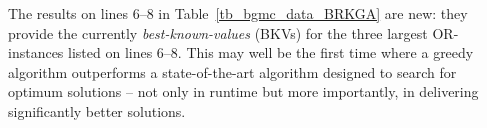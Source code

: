 \begin{description}
The results on lines 6--8 in Table~\ref{tb_bgmc_data_BRKGA} 
are new: they provide the currently {\it best-known-values} (BKVs) for the
three largest OR-instances listed on lines 6--8. 
This may well be the first time where a greedy algorithm outperforms
a state-of-the-art algorithm designed to search for optimum solutions -- 
not only in runtime but more importantly, in delivering 
significantly better solutions.
\end{description}

